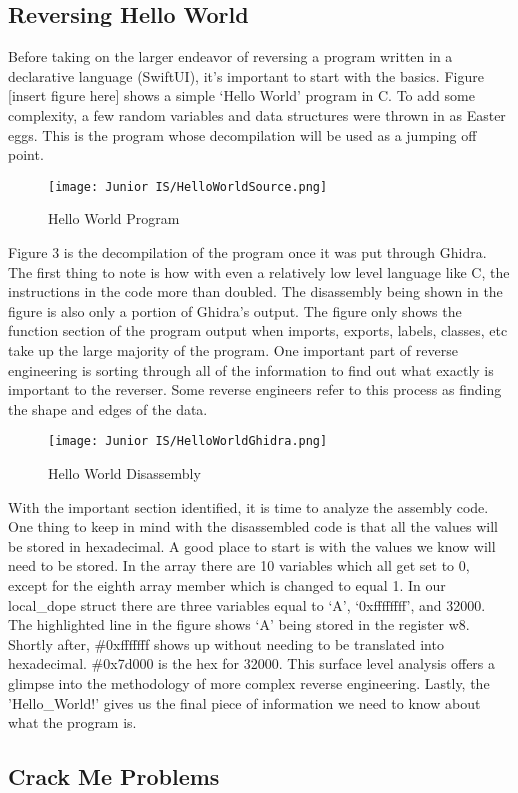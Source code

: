 \documentclass[12pt]{article}
\begin{document}
\subsection{Reversing Hello World}
Before taking on the larger endeavor of reversing a program written in a declarative language (SwiftUI), it’s important to start with the basics. Figure [insert figure here] shows a simple ‘Hello World’ program in C. To add some complexity, a few random variables and data structures were thrown in as Easter eggs. This is the program whose decompilation will be used as a jumping off point.
\begin{figure}[h]
\caption{Hello World Program}
\texttt{[image: Junior IS/HelloWorldSource.png]}
\end{figure}
Figure 3 is the decompilation of the program once it was put through Ghidra. The first thing to note is how with even a relatively low level language like C, the instructions in the code more than doubled. The disassembly being shown in the figure is also only a portion of Ghidra’s output. The figure only shows the function section of the program output when imports, exports, labels, classes, etc take up the large majority of the program. One important part of reverse engineering is sorting through all of the information to find out what exactly is important to the reverser. Some reverse engineers refer to this process as finding the shape and edges of the data. 
\begin{figure}[h]
\caption{Hello World Disassembly}
\texttt{[image: Junior IS/HelloWorldGhidra.png]}
\end{figure}
With the important section identified, it is time to analyze the assembly code. One thing to keep in mind with the disassembled code is that all the values will be stored in hexadecimal. A good place to start is with the values we know will need to be stored. In the array there are 10 variables which all get set to 0, except for the eighth array member which is changed to equal 1. In our local\_dope struct there are three variables equal to ‘A’, ‘0xffffffff’, and 32000. The highlighted line in the figure shows ‘A’ being stored in the register w8. Shortly after, \#0xfffffff shows up without needing to be translated into hexadecimal. \#0x7d000 is the hex for 32000. This surface level analysis offers a glimpse into the methodology of more complex reverse engineering. Lastly, the 'Hello\_World!' gives us the final piece of information we need to know about what the program is.


\subsection{Crack Me Problems}
\end{document}
